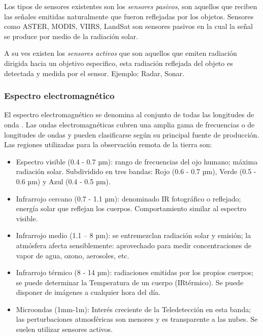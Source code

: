 Los tipos de sensores existentes son los  \textit{sensores pasivos}, son aquellos que reciben las señales emitidas naturalmente que fueron reflejadas por los objetos. Sensores como ASTER, MODIS, VIIRS, LandSat son sensores pasivos en la cual la señal se produce por medio de la radiación solar.

A su ves existen los \textit{sensores activos} que son aquellos que emiten radiación dirigida hacia un objetivo especifico, esta radiación reflejada del objeto es detectada y medida por el sensor. Ejemplo: Radar, Sonar.

\subsubsection{Espectro electromagnético}

El espectro electromagnético se denomina al conjunto de todas las longitudes de onda \citep{chuvieco}. Las ondas electromagnéticas cubren una amplia gama de frecuencias o de longitudes de ondas y pueden clasificarse según su principal fuente de producción. 
Las regiones utilizadas para la observación remota de la tierra son:
\begin{itemize}
\item Espectro visible (0.4 - 0.7 µm): rango de frecuencias del ojo humano; máxima radiación solar. Subdividido en tres bandas: Rojo (0.6 - 0.7 µm), Verde (0.5 - 0.6 µm) y Azul (0.4 - 0.5 µm).

\item Infrarrojo cercano (0.7 - 1.1 µm): denominado IR fotográfico o reflejado; energía solar que reflejan los cuerpos. Comportamiento similar al espectro visible.

\item Infrarrojo medio (1.1 – 8 µm): se entremezclan radiación solar y emisión; la atmósfera afecta sensiblemente: aprovechado para medir concentraciones de vapor de agua, ozono, aerosoles, etc.

\item Infrarrojo térmico (8 - 14 µm): radiaciones emitidas por los propios cuerpos; se puede determinar la Temperatura de un cuerpo (IRtérmico). Se puede disponer de imágenes a cualquier hora del día.

\item Microondas (1mm-1m): Interés creciente de la Teledetección en esta banda; las perturbaciones atmosféricas son menores y es transparente a las nubes. Se suelen utilizar sensores activos. 

\end{itemize}

